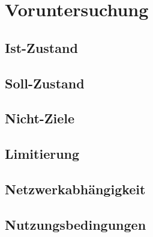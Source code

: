 \chapter{Voruntersuchung}



\section{Ist-Zustand}

\section{Soll-Zustand}

\section{Nicht-Ziele}

\section{Limitierung}

\section{Netzwerkabhängigkeit}

\section{Nutzungsbedingungen}